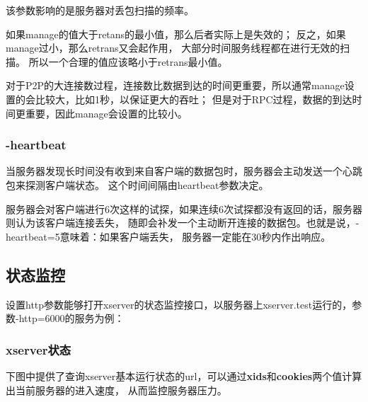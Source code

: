 该参数影响的是服务器对丢包扫描的频率。

如果manage的值大于retans的最小值，那么后者实际上是失效的；
反之，如果manage过小，那么retrans又会起作用，
大部分时间服务线程都在进行无效的扫描。
所以一个合理的值应该略小于retrans最小值。

对于P2P的大连接数过程，连接数比数据到达的时间更重要，所以通常manage设置的会比较大，比如1秒，以保证更大的吞吐；
但是对于RPC过程，数据的到达时间更重要，因此manage会设置的比较小。

\subsubsection{-heartbeat}

当服务器发现长时间没有收到来自客户端的数据包时，服务器会主动发送一个心跳包来探测客户端状态。
这个时间间隔由heartbeat参数决定。

服务器会对客户端进行6次这样的试探，如果连续6次试探都没有返回的话，服务器则认为该客户端连接丢失，
随即会补发一个主动断开连接的数据包。也就是说，-heartbeat=5意味着：如果客户端丢失，
服务器一定能在30秒内作出响应。

\subsection{状态监控}

设置http参数能够打开xserver的状态监控接口，以服务器上xserver.test运行的，参数-http=6000的服务为例：

\subsubsection{xserver状态}

下图中提供了查询xserver基本运行状态的url，可以通过{\bf{xids}}和{\bf{cookies}}两个值计算出当前服务器的进入速度，
从而监控服务器压力。

